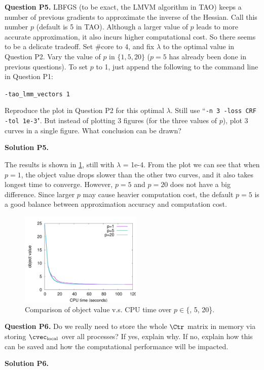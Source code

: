 \documentclass[11pt]{report}
\begin{document}
{\bf Question P5.}
LBFGS (to be exact, the LMVM algorithm in TAO) keeps a number of previous gradients to approximate the inverse of the Hessian.
Call this number $p$ (default is 5 in TAO).
Although a larger value of $p$ leads to more accurate approximation, it also incurs higher computational cost.
So there seems to be a delicate tradeoff.
Set \#core to 4, and fix $\lambda$ to the optimal value in Question P2.
Vary the value of $p$ in $\{1, 5, 20\}$ ($p=5$ has already been done in previous questions).
To set $p$ to 1, just append the following to the command line in Question P1:

\verb!-tao_lmm_vectors 1!

Reproduce the plot in Question P2 for this optimal $\lambda$.
Still use ``\verb!-n 3 -loss CRF -tol 1e-3!".
But instead of plotting 3 figures (for the three values of $p$),
plot 3 curves in a single figure.
What conclusion can be drawn?

{\bf Solution P5.}

The results is shown in \ref{fig:LBFGS}, still with $\lambda$ = {\sf 1e-4}. From the plot we can see that when $p=1$, the object value drops slower than the other two curves, and it also takes longest time to converge. However, $p=5$ and $p=20$ does not have a big difference. Since larger $p$ may cause heavier computation cost, the default $p=5$ is a good balance between approximation accuracy and computation cost.

\begin{figure}[htbp!] 
\centering
\includegraphics[width=5.8cm]{p5_LBFGS}
\caption{Comparison of object value v.s. CPU time over $p \in \{${, 5, 20}\}.}
\label{fig:LBFGS}
\end{figure}

{\bf Question P6.}
Do we really need to store the whole $\Ctr$ matrix in memory via storing $\cvec_{\text{local}}$ over all processes?
If yes, explain why.
If no, explain how this can be saved and how the computational performance will be impacted.

{\bf Solution P6.}
\end{document}
